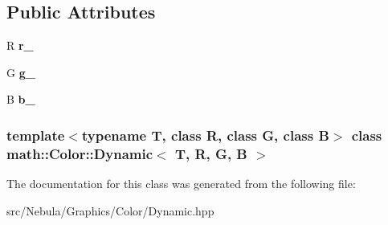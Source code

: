 \subsection*{\-Public \-Attributes}
\begin{DoxyCompactItemize}
\item 
\hypertarget{classmath_1_1Color_1_1Dynamic_acff65527ca36b495e192595d4b497498}{\-R {\bfseries r\-\_\-}}\label{classmath_1_1Color_1_1Dynamic_acff65527ca36b495e192595d4b497498}

\item 
\hypertarget{classmath_1_1Color_1_1Dynamic_a53fcc569fd402f76d834369dc011aaa3}{\-G {\bfseries g\-\_\-}}\label{classmath_1_1Color_1_1Dynamic_a53fcc569fd402f76d834369dc011aaa3}

\item 
\hypertarget{classmath_1_1Color_1_1Dynamic_ad6f2a9af60170e9f690fdb447b377027}{\-B {\bfseries b\-\_\-}}\label{classmath_1_1Color_1_1Dynamic_ad6f2a9af60170e9f690fdb447b377027}

\end{DoxyCompactItemize}
\subsubsection*{template$<$typename T, class R, class G, class B$>$ class math\-::\-Color\-::\-Dynamic$<$ T, R, G, B $>$}



\-The documentation for this class was generated from the following file\-:\begin{DoxyCompactItemize}
\item 
src/\-Nebula/\-Graphics/\-Color/\-Dynamic.\-hpp\end{DoxyCompactItemize}
